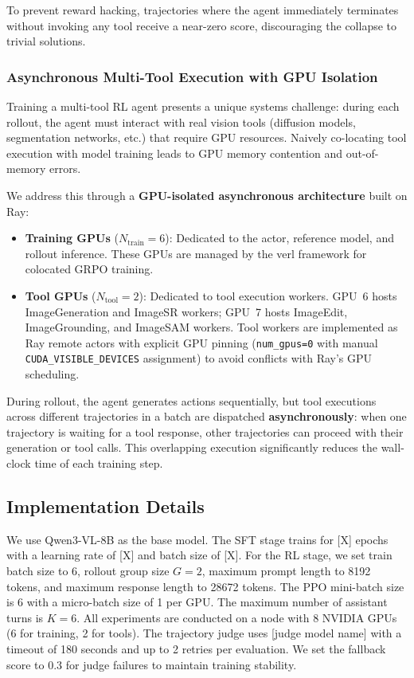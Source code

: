 \documentclass[11pt]{article}
\begin{document}
To prevent reward hacking, trajectories where the agent immediately terminates without invoking any tool receive a near-zero score, discouraging the collapse to trivial solutions.

\subsubsection{Asynchronous Multi-Tool Execution with GPU Isolation}

Training a multi-tool RL agent presents a unique systems challenge: during each rollout, the agent must interact with real vision tools (diffusion models, segmentation networks, etc.) that require GPU resources. Naively co-locating tool execution with model training leads to GPU memory contention and out-of-memory errors.

We address this through a \textbf{GPU-isolated asynchronous architecture} built on Ray:

\begin{itemize}
    \item \textbf{Training GPUs} ($N_{\text{train}}=6$): Dedicated to the actor, reference model, and rollout inference. These GPUs are managed by the verl framework for colocated GRPO training.
    \item \textbf{Tool GPUs} ($N_{\text{tool}}=2$): Dedicated to tool execution workers. GPU~6 hosts ImageGeneration and ImageSR workers; GPU~7 hosts ImageEdit, ImageGrounding, and ImageSAM workers. Tool workers are implemented as Ray remote actors with explicit GPU pinning (\texttt{num\_gpus=0} with manual \texttt{CUDA\_VISIBLE\_DEVICES} assignment) to avoid conflicts with Ray's GPU scheduling.
\end{itemize}

During rollout, the agent generates actions sequentially, but tool executions across different trajectories in a batch are dispatched \textbf{asynchronously}: when one trajectory is waiting for a tool response, other trajectories can proceed with their generation or tool calls. This overlapping execution significantly reduces the wall-clock time of each training step.

\subsection{Implementation Details}

We use Qwen3-VL-8B as the base model. The SFT stage trains for [X] epochs with a learning rate of [X] and batch size of [X]. For the RL stage, we set train batch size to 6, rollout group size $G=2$, maximum prompt length to 8192 tokens, and maximum response length to 28672 tokens. The PPO mini-batch size is 6 with a micro-batch size of 1 per GPU. The maximum number of assistant turns is $K=6$. All experiments are conducted on a node with 8 NVIDIA GPUs (6 for training, 2 for tools). The trajectory judge uses [judge model name] with a timeout of 180 seconds and up to 2 retries per evaluation. We set the fallback score to 0.3 for judge failures to maintain training stability.
\end{document}
